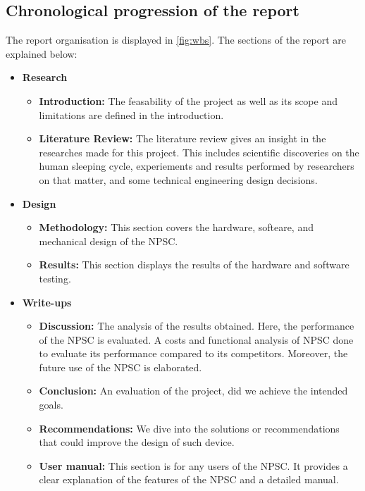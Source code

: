 \subsection{Chronological progression of the report}
The report organisation is displayed in \cref{fig:wbs}. The sections of the report are explained below:
\begin{itemize}
\item \textbf{Research}
\begin{itemize}
\item \textbf{Introduction:} The feasability of the project as well as its scope and limitations are defined in the introduction. 
\item \textbf{Literature Review:} The literature review gives an insight in the researches made for this project. This includes scientific discoveries on the human sleeping cycle, experiements and results performed  by researchers on that matter, and some technical engineering design decisions. 
\end{itemize} 
\item \textbf{Design} 
\begin{itemize}
\item \textbf{Methodology:} This section covers the hardware, softeare, and mechanical design of the NPSC. 
\item \textbf{Results:} This section displays the results of the hardware and software testing. 
\end{itemize}
\item \textbf{Write-ups} 
\begin{itemize}
\item \textbf{Discussion:} The analysis of the results obtained. Here, the performance of the NPSC is evaluated. A costs and functional analysis of NPSC done to evaluate its performance compared to its competitors. Moreover, the future use of the NPSC is elaborated. 
\item \textbf{Conclusion:} An evaluation of the project, did we achieve the intended goals.
\item \textbf{Recommendations:} We dive into the solutions or recommendations that could improve the design of such device.
\item \textbf{User manual:} This section is for any users of the NPSC. It provides a clear explanation of the features of the NPSC and a detailed manual. 
\end{itemize}
\end{itemize}